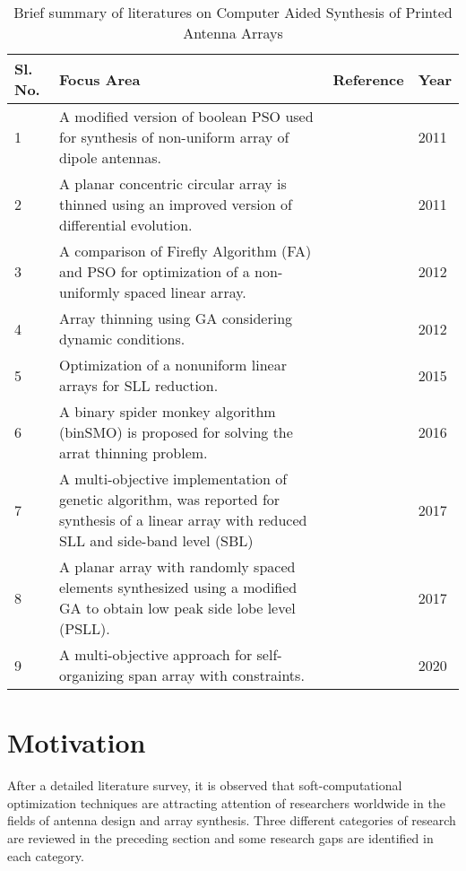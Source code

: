\begin{table*}[]
\caption{Brief summary of literatures on Computer Aided Synthesis of Printed Antenna Arrays}
\label{tab_litsurv_3}
\begin{tabular}{|p{}|p{}|p{}|p{}|}
\toprule
Sl. No. & Focus Area & Reference & Year \\ \midrule
1 &  A modified version of boolean PSO used for synthesis of non-uniform array of dipole antennas. & \cite{arraySynth1} & 2011 \\ \hline
2 &  A planar concentric circular array is thinned using an improved version of differential evolution. & \cite{arrayThin1} & 2011 \\ \hline
3 &  A comparison of Firefly Algorithm (FA) and PSO for optimization of a non-uniformly spaced linear array. & \cite{nunUniformLinear} & 2012 \\ \hline
4 &  Array thinning using GA considering dynamic conditions. & \cite{thinningGA} & 2012 \\ \hline
5 &  Optimization of a nonuniform linear arrays for SLL reduction. & \cite{arraySynth3} & 2015 \\ \hline
6 &  A binary spider monkey algorithm (binSMO) is proposed for solving the arrat thinning problem. & \cite{arrayThin2} & 2016 \\ \hline
7 &  A multi-objective implementation of genetic algorithm, was reported for synthesis of a linear array with reduced SLL and side-band level (SBL) & \cite{arraySynth2} & 2017 \\ \hline
8 &  A planar array with randomly spaced elements synthesized using a modified GA to obtain low peak side lobe level (PSLL). & \cite{randomlySpacedArray} & 2017 \\ \hline
9 &  A multi-objective approach for self-organizing span array with constraints. & \cite{selfOrgOpt} & 2020 \\ \bottomrule
\end{tabular}%
\end{table*}

\section{Motivation} \label{c1sec_motiv}
After a detailed literature survey, it is observed that soft-computational optimization techniques are attracting attention of researchers worldwide in the fields of antenna design and array synthesis. Three different categories of research are reviewed in the preceding section and some research gaps are identified in each category.

